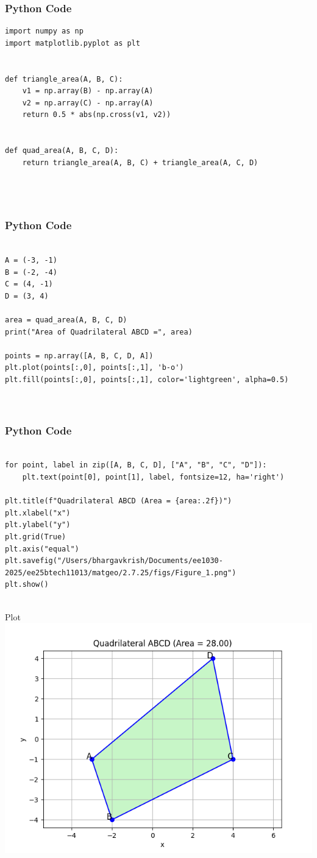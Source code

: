 \documentclass{beamer}
\begin{document}
\begin{frame}[fragile]
    \frametitle{Python Code}
    \begin{lstlisting}
import numpy as np
import matplotlib.pyplot as plt


def triangle_area(A, B, C):
    v1 = np.array(B) - np.array(A)
    v2 = np.array(C) - np.array(A)
    return 0.5 * abs(np.cross(v1, v2))


def quad_area(A, B, C, D):
    return triangle_area(A, B, C) + triangle_area(A, C, D)




    \end{lstlisting}
\end{frame}

\begin{frame}[fragile]
    \frametitle{Python Code}
    \begin{lstlisting}

A = (-3, -1)
B = (-2, -4)
C = (4, -1)
D = (3, 4)

area = quad_area(A, B, C, D)
print("Area of Quadrilateral ABCD =", area)

points = np.array([A, B, C, D, A])  
plt.plot(points[:,0], points[:,1], 'b-o')
plt.fill(points[:,0], points[:,1], color='lightgreen', alpha=0.5)



    \end{lstlisting}
\end{frame}

\begin{frame}[fragile]
    \frametitle{Python Code}
    \begin{lstlisting}

for point, label in zip([A, B, C, D], ["A", "B", "C", "D"]):
    plt.text(point[0], point[1], label, fontsize=12, ha='right')

plt.title(f"Quadrilateral ABCD (Area = {area:.2f})")
plt.xlabel("x")
plt.ylabel("y")
plt.grid(True)
plt.axis("equal")
plt.savefig("/Users/bhargavkrish/Documents/ee1030-2025/ee25btech11013/matgeo/2.7.25/figs/Figure_1.png")
plt.show()


    \end{lstlisting}
\end{frame}

\begin{frame}{Plot}
    \centering
    \includegraphics[width=\columnwidth, height=0.8\textheight, keepaspectratio]{figs/Figure_1.png}   
\end{frame}
\end{document}
